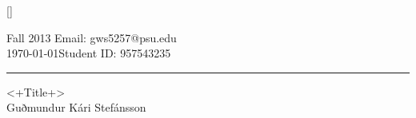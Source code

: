 \documentclass[12pt,a4paper]{article}
\begin{document}
%


\titleformat{\section}{\LARGE\scshape\bfseries\raggedright}{}{0em}{}[\titlerule]
\fancyhf{}
\pagestyle{fancy}


 Fall 2013 \hfill Email: gws5257@psu.edu\\
\today \hfill Student ID: 957543235
\rule[8pt]{\textwidth}{1pt}
\begin{center}
	\LARGE{<+Title+>} \\
	\vspace{0.4cm}
	\large{Guðmundur Kári Stefánsson}
\end{center}

\end{document}
